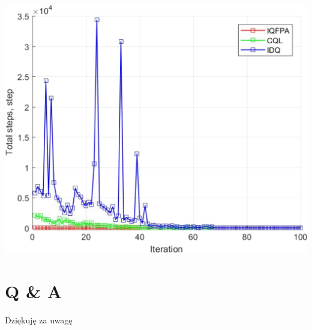 \documentclass[aspectratio=169,15pt,]{beamer}
\begin{document}
\begin{frame}
\includegraphics[width =\textwidth,height=\textheight]{Obrazy/Test4.jpg}
\end{frame}
\section{Q \& A}
\begin{frame}
	\sectionpage

\end{frame}

\begin{frame}
\begin{center}
	\Huge{Dziękuję za uwagę}

\end{center}

\end{frame}
\end{document}
